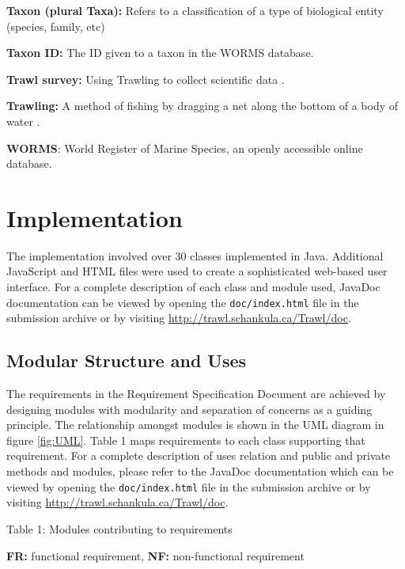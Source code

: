 \documentclass{article}
\begin{document}
\noindent\textbf{Taxon (plural Taxa):} Refers to a classification of a type of biological entity (species, family, etc)

\noindent\textbf{Taxon ID:} The ID given to a taxon in the WORMS database.

\noindent\textbf{Trawl survey:} Using Trawling to collect scientific data \citep{walsh1997efficiency}.

\noindent\textbf{Trawling:} A method of fishing by dragging a net along the bottom of a body of water \citep{walsh1997efficiency}.

\noindent\textbf{WORMS}: World Register of Marine Species, an openly accessible online database.

\section{Implementation}
The implementation involved over 30 classes implemented in Java. Additional JavaScript and HTML files were used to create a sophisticated web-based user interface. For a complete description of each class and module used, JavaDoc documentation can be viewed by opening the \texttt{doc/index.html} file in the submission archive or by visiting \url{http://trawl.schankula.ca/Trawl/doc}.


\subsection {Modular Structure and Uses}
The requirements in the Requirement Specification Document are achieved by designing modules with modularity and separation of concerns as a guiding principle. The relationship amongst modules is shown in the UML diagram in figure \ref{fig:UML}. Table 1 maps requirements to each class supporting that requirement. For a complete description of uses relation and public and private methods and modules, please refer to the JavaDoc documentation which can be viewed by opening the \texttt{doc/index.html} file in the submission archive or by visiting \url{http://trawl.schankula.ca/Trawl/doc}.\\

\newpage
\begin{center}
Table 1: Modules contributing to requirements

\textbf{FR:} functional requirement, \textbf{NF:} non-functional requirement\\\end{center}
\end{document}
